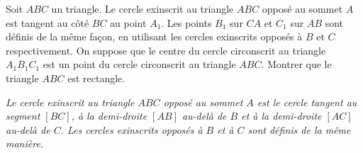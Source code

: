 Soit $ABC$ un triangle. Le cercle exinscrit au triangle $ABC$ opposé au sommet $A$ est tangent au côté $BC$ au
point $A_1$. Les points $B_1$ sur $CA$ et $C_1$ sur $AB$ sont définis de la même façon, en utilisant les
cercles exinscrits opposés à $B$ et $C$ respectivement. On suppose que le centre du cercle circonscrit au
triangle $A_1B_1C_1$ est un point du cercle circonscrit au triangle $ABC$. Montrer que le triangle $ABC$ est
rectangle.

\emph{Le cercle exinscrit au triangle $ABC$ opposé au sommet $A$ est le cercle tangent au segment $[BC]$, à la
demi-droite $[AB]$ au-delà de $B$ et à la demi-droite $[AC]$ au-delà de $C$. Les cercles exinscrits opposés à
$B$ et à $C$ sont définis de la même manière.}
